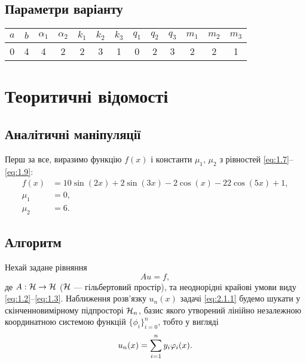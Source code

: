 \subsection{Параметри варіанту}

\begin{table}[H]
    \centering
    \begin{tabular}{|c|c||c|c||c|c|c||c|c|c||c|c|c|}
        \hline
        $a$ & $b$ & $\alpha_1$ & $\alpha_2$ & $k_1$ & $k_2$ & $k_3$ & $q_1$ & $q_2$ & $q_3$ & $m_1$ & $m_2$ & $m_3$ \\ \hline
        0 & 4 & 4 & 2 & 2 & 3 & 1 & 0 & 2 & 3 & 2 & 2 & 1 \\ \hline
    \end{tabular}
\end{table}

\section{Теоритичні відомості}

\setcounter{subsection}{-1}
\subsection{Аналітичні маніпуляції}

Перш за все, виразимо функцію $f(x)$ і константи $\mu_1$, $\mu_2$ з рівностей \eqref{eq:1.7}--\eqref{eq:1.9}:
\begin{align}
    \label{eq:2.0.1}
    f(x) &= 10 \sin(2 x) + 2 \sin(3 x) - 2 \cos(x) - 22 \cos(5x) + 1, \\
    \label{eq:2.0.2}
    \mu_1 &= 0, \\
    \label{eq:2.0.3}
    \mu_2 &= 6.
\end{align}

\subsection{Алгоритм}

Нехай задане рівняння 
\begin{equation}
    \label{eq:2.1.1}
    A u = f,
\end{equation}
де $A: \mathcal{H} \rightarrow \mathcal{H}$ ($\mathcal{H}$ --- гільбертовий простір), та неоднорідні крайові умови виду \eqref{eq:1.2}--\eqref{eq:1.3}. Наближення розв'язку $u_n(x)$ задачі \eqref{eq:2.1.1} будемо шукати у скінченновимірному підпросторі $\mathcal{H}_n$, базис якого утворений лінійно незалежною координатною системою функцій $\{\phi_i\}_{i = 0}^n$, тобто у вигляді
\begin{equation}
    \label{eq:2.1.2}
    u_n(x) = \displaystyle\sum\limits_{i = 1}^n y_i \varphi_i(x).
\end{equation}

